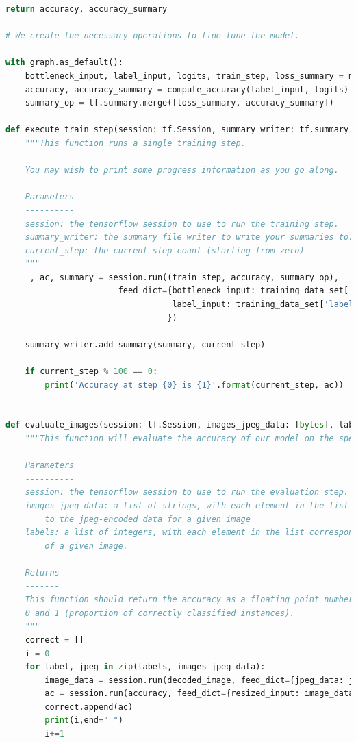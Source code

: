 \documentclass[hyperref]{article}
\theoremstyle{nonumberplain}
\begin{document}
\begin{appendices}
\begin{lstlisting}[language=Python]
    return accuracy, accuracy_summary

# We create the necessary operations to fine tune the model.

with graph.as_default():
    bottleneck_input, label_input, logits, train_step, loss_summary = make_final_layers(bottleneck, len(label_maps))
    accuracy, accuracy_summary = compute_accuracy(label_input, logits)
    summary_op = tf.summary.merge([loss_summary, accuracy_summary])

def execute_train_step(session: tf.Session, summary_writer: tf.summary.FileWriter, current_step: int):
    """This function runs a single training step.

    You may wish to print some progress information as you go along.

    Parameters
    ----------
    session: the tensorflow session to use to run the training step.
    summary_writer: the summary file writer to write your summaries to.
    current_step: the current step count (starting from zero)
    """
    _, ac, summary = session.run((train_step, accuracy, summary_op),
                       feed_dict={bottleneck_input: training_data_set['bottlenecks'],
                                  label_input: training_data_set['labels']
                                 })

    summary_writer.add_summary(summary, current_step)

    if current_step % 100 == 0:
        print('Accuracy at step {0} is {1}'.format(current_step, ac))


def evaluate_images(session: tf.Session, images_jpeg_data: [bytes], labels: [int]):
    """This function will evaluate the accuracy of our model on the specified data.

    Parameters
    ----------
    session: the tensorflow session to use to run the evaluation step.
    images_jpeg_data: a list of strings, with each element in the list corresponding
        to the jpeg-encoded data for a given image
    labels: a list of integers, with each element in the list corresponding to the label
        of a given image.

    Returns
    -------
    This function should return the accuracy as a floating point number between
    0 and 1 (proportion of correctly classified instances).
    """
    correct = []
    i = 0
    for label, jpeg in zip(labels, images_jpeg_data):
        image_data = session.run(decoded_image, feed_dict={jpeg_data: jpeg})
        ac = session.run(accuracy, feed_dict={resized_input: image_data, label_input: [label]})
        correct.append(ac)
        print(i,end=" ")
        i+=1


\end{lstlisting}
\end{appendices}
\end{document}
